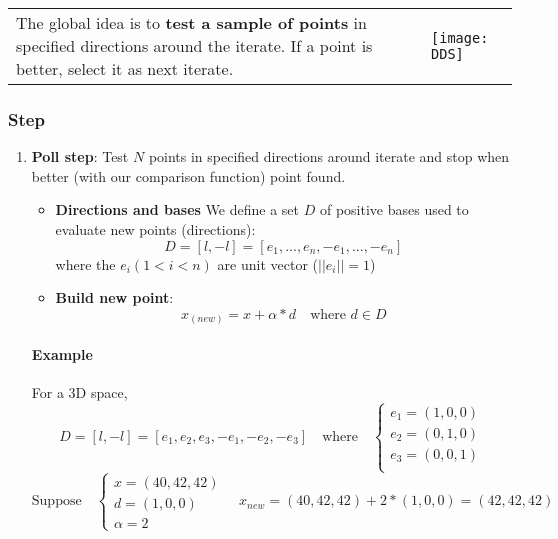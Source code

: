 \begin{tabular}{m{12cm}m{3cm}}
The global idea is to \textbf{test a sample of points} in specified
directions around the iterate.
If a point is better, select it as next iterate.
&
\texttt{[image: DDS]}
\end{tabular}

\subsubsection{Step}

\begin{enumerate}
    \item \textbf{Poll step}: Test $N$ points in specified directions
        around iterate and stop when better (with our comparison
        function) point found.

        \begin{itemize}

            \item \textbf{Directions and bases}
                We define a set $D$ of positive bases used to evaluate new
                points (directions):
                $$D = [l, -l] = [e_1,..., e_n, -e_1,..., -e_n]$$
                where the $e_i (1 < i < n)$ are unit vector ($||e_i|| = 1$)

            \item \textbf{Build new point}: 
                $$x_(new) = x+\alpha*d \quad \textrm{where } d \in D$$
        \end{itemize}

        \paragraph{Example} For a 3D space,
        $$D = [l, -l] = [e_1, e_2, e_3, -e_1, -e_2, -e_3] \quad
        \textrm{where} \quad \begin{cases}
            e_1 = (1,0,0) \\
            e_2 = (0,1,0)\\
            e_3 = (0,0,1)\\
        \end{cases} $$
        $$\textrm{Suppose} \quad \begin{cases} 
            x = (40, 42, 42)\\
            d = (1, 0, 0)\\
            \alpha =2
        \end{cases} \quad           
        x_{new}  = (40, 42, 42) + 2 * (1, 0, 0) = (42, 42, 42)$$



\end{enumerate}
